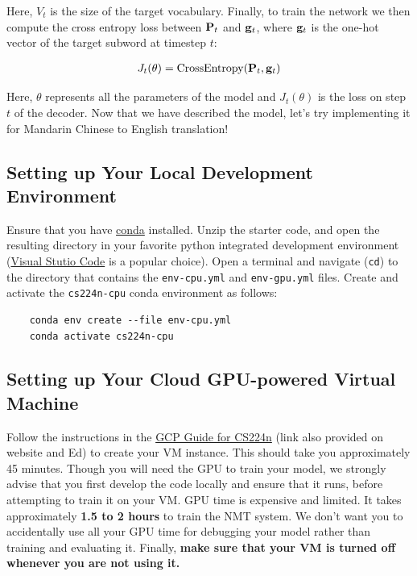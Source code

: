 Here, $V_{t}$ is the size of the target vocabulary. Finally, to train the network we then compute the cross entropy loss between $\mathbf{P}_t$ and $\mathbf{g}_{t}$, where $\mathbf{g}_{t}$ is the one-hot vector of the target subword at timestep $t$:

\begin{align}
    J_t(\theta) = \mathrm{CrossEntropy}(\mathbf{P}_t,\mathbf{g}_{t})
\end{align}

Here, $\theta$ represents all the parameters of the model and $J_t(\theta)$ is the loss on step $t$ of the decoder.
Now that we have described the model, let's try implementing it for Mandarin Chinese to English translation!


\subsection*{Setting up Your Local Development Environment}
Ensure that you have \href{https://docs.anaconda.com/free/miniconda/index.html}{conda} installed.
Unzip the starter code, and open the resulting directory in your favorite python integrated development environment (\href{https://code.visualstudio.com/}{Visual Stutio Code} is a popular choice). Open a terminal and navigate (\texttt{cd}) to the directory that contains the \texttt{env-cpu.yml} and \texttt{env-gpu.yml} files. Create and activate the \texttt{cs224n-cpu} conda environment as follows:
\begin{lstlisting}
    conda env create --file env-cpu.yml
    conda activate cs224n-cpu
\end{lstlisting}


\subsection*{Setting up Your Cloud GPU-powered Virtual Machine}
Follow the instructions in the \href{https://docs.google.com/document/d/1FLx0CXIn-SoExxKM1efC-E-6iBjUR4uEnpGnfemMMR0/edit?pli=1#heading=h.4tqnggp12z76}{GCP Guide for CS224n}
(link also provided on website and Ed) to create your VM instance. This should take you approximately 45 minutes. Though you will need the GPU to train your model, we strongly advise that you first develop the code locally and ensure that it runs, before attempting to train it on your VM. GPU time is expensive and limited. It takes approximately \textbf{1.5 to 2 hours} to train the NMT system. We don't want you to accidentally use all your GPU time for debugging your model rather than training and evaluating it. Finally, \textbf{make sure that your VM is turned off whenever you are not using it.}

